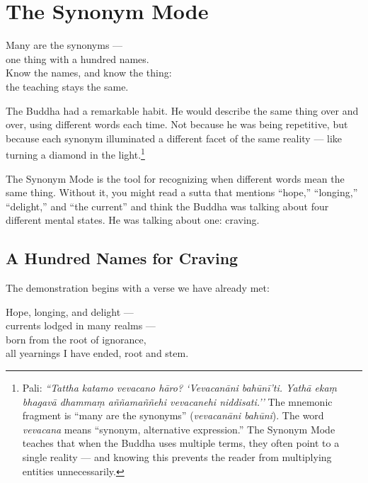 \chapter{The Synonym Mode}
\label{ch:synonyms}

\begin{versebox}
Many are the synonyms ---\\
one thing with a hundred names.\\
Know the names, and know the thing:\\
the teaching stays the same.
\end{versebox}

\noindent The Buddha had a remarkable habit. He would describe the same thing over and over, using different words each time. Not because he was being repetitive, but because each synonym illuminated a different facet of the same reality --- like turning a diamond in the light.\footnote{Pali: \textit{``Tattha katamo vevacano hāro? `Vevacanāni bahūnī'ti. Yathā ekaṃ bhagavā dhammaṃ aññamaññehi vevacanehi niddisati.''} The mnemonic fragment is ``many are the synonyms'' (\textit{vevacanāni bahūni}). The word \textit{vevacana} means ``synonym, alternative expression.'' The Synonym Mode teaches that when the Buddha uses multiple terms, they often point to a single reality --- and knowing this prevents the reader from multiplying entities unnecessarily.}

The Synonym Mode is the tool for recognizing when different words mean the same thing. Without it, you might read a sutta that mentions ``hope,'' ``longing,'' ``delight,'' and ``the current'' and think the Buddha was talking about four different mental states. He was talking about one: craving.

\section*{A Hundred Names for Craving}

The demonstration begins with a verse we have already met:

\begin{versebox}
Hope, longing, and delight ---\\
currents lodged in many realms ---\\
born from the root of ignorance,\\
all yearnings I have ended, root and stem.
\end{versebox}

